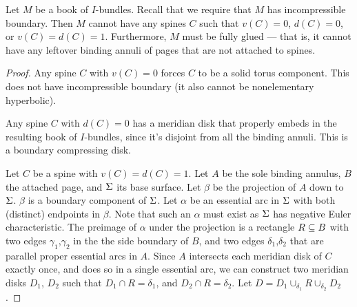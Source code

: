 \begin{prop}\label{P:1ptcap}

Let $M$ be a book of $I$-bundles. Recall that we require that $M$ has
incompressible boundary. Then $M$ cannot have any spines $C$ such that
$v(C)=0$, $d(C)=0$, or $v(C)=d(C)=1$. Furthermore, $M$ must be fully glued ---
that is, it cannot have any leftover binding annuli of pages that are not
attached to spines.

\end{prop}

\begin{proof}

Any spine $C$ with $v(C)=0$ forces $C$ to be a solid torus component. This does
not have incompressible boundary (it also cannot be nonelementary hyperbolic).

Any spine $C$ with $d(C)=0$ has a meridian disk that properly embeds in the
resulting book of $I$-bundles, since it's disjoint from all the binding annuli.
This is a boundary compressing disk.


Let $C$ be a spine with $v(C)=d(C)=1$. Let $A$ be the sole binding annulus, $B$
the attached page, and $\Sigma$ its base surface. Let $\beta$ be the projection of
$A$ down to $\Sigma$. $\beta$ is a boundary component of $\Sigma$. Let $\alpha$ be an
essential arc in $\Sigma$ with both (distinct) endpoints in $\beta$. Note that
such an $\alpha$ must exist as $\Sigma$ has negative Euler characteristic. The
preimage of $\alpha$ under the projection is a rectangle $R \subseteq B$ with two
edges $\gamma_1$,$\gamma_2$ in the the side boundary of $B$, and two edges
$\delta_1$,$\delta_2$ that are parallel proper essential arcs in $A$.  Since
$A$ intersects each meridian disk of $C$ exactly once, and does so in a single
essential arc, we can construct two meridian disks $D_1$, $D_2$ such that $D_1
\cap R = \delta_1$, and $D_2 \cap R = \delta_2$.  Let $D = D_1 \cup_{\delta_1}
R \cup_{\delta_2} D_2$.


\end{proof}
